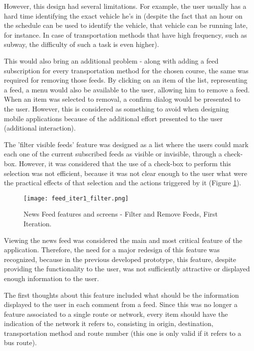 However, this design had several limitations. For example, the user usually has a hard time identifying the exact vehicle he's in (despite the fact that an hour on the schedule can be used to identify the vehicle, that vehicle can be running late, for instance. In case of transportation methods that have high frequency, such as subway, the difficulty of such a task is even higher).


This would also bring an additional problem - along with adding a feed subscription for every transportation method for the chosen course, the same was required for removing those feeds.
By clicking on an item of the list, representing a feed, a menu would also be available to the user, allowing him to remove a feed. When an item was selected to removal, a confirm dialog would be presented to the user. However, this is considered as something to avoid when designing mobile applications because of the additional effort presented to the user (additional interaction).

The 'filter visible feeds' feature was designed as a list where the users could mark each one of the current subscribed feeds as visible or invisible, through a check-box. However, it was considered that the use of a check-box to perform this selection was not efficient, because it was not clear enough to the user what were the practical effects of that selection and the actions triggered by it (Figure \ref{fig:feed_iter1_filter}).

\begin{figure}[H]
  \begin{center}
    \leavevmode
    \texttt{[image: feed\_iter1\_filter.png]}
    \caption{News Feed features and screens - Filter and Remove Feeds, First Iteration.}
    \label{fig:feed_iter1_filter}
  \end{center}
\end{figure}


Viewing the news feed was considered the main and most critical feature of the application. Therefore, the need for a major redesign of this feature was recognized, because in the previous developed prototype, this feature, despite providing the functionality to the user, was not sufficiently attractive or displayed enough information to the user.

The first thoughts about this feature included what should be the information displayed to the user in each comment from a feed.
Since this was no longer a feature associated to a single route or network, every item should have the indication of the network it refers to, consisting in origin, destination, transportation method and route number (this one is only valid if it refers to a bus route).


